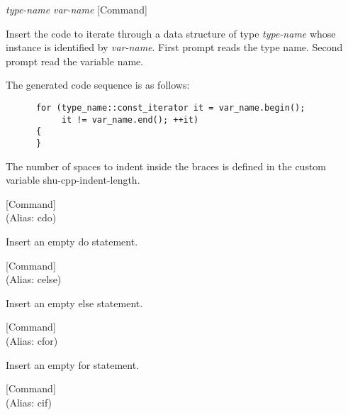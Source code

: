 \vspace{1em}
\noindent
{}
\usebox{\funcname}\emph{type-name} \emph{var-name}
 \hfill [Command]

\begin{doc-string}
Insert the code to iterate through a data structure of type \emph{type-name} whose
instance is identified by \emph{var-name}.  First prompt reads the type name.  Second
prompt read the variable name.

The generated code sequence is as follows:

\small{\begin{verbatim}
      for (type_name::const_iterator it = var_name.begin();
           it != var_name.end(); ++it)
      {
      }
\end{verbatim}}

The number of spaces to indent inside the braces is defined in the custom
variable shu-cpp-indent-length.
\end{doc-string}

\vspace{1em}
\noindent
{}
\usebox{\funcname}
 \hfill [Command]\\%
 (Alias: cdo)

\begin{doc-string}
Insert an empty do statement.
\end{doc-string}

\vspace{1em}
\noindent
{}
\usebox{\funcname}
 \hfill [Command]\\%
 (Alias: celse)

\begin{doc-string}
Insert an empty else statement.
\end{doc-string}

\vspace{1em}
\noindent
{}
\usebox{\funcname}
 \hfill [Command]\\%
 (Alias: cfor)

\begin{doc-string}
Insert an empty for statement.
\end{doc-string}

\vspace{1em}
\noindent
{}
\usebox{\funcname}
 \hfill [Command]\\%
 (Alias: cif)

